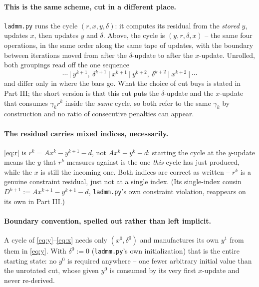 \documentclass[11pt]{article}
\newcommand{\code}[1]{\texttt{#1}}
\begin{document}
\paragraph{This is the same scheme, cut in a different place.}
\code{ladmm.py} runs the cycle $(r,x,y,\delta)$: it computes its residual from the
\emph{stored} $y$, updates $x$, then updates $y$ and $\delta$. Above, the cycle is
$(y,r,\delta,x)$ -- the same four operations, in the same order along the same
tape of updates, with the boundary between iterations moved from after the
$\delta$-update to after the $x$-update. Unrolled, both groupings read off the one
sequence
\[
\cdots\ \big|\ y^{k+1},\ \delta^{k+1}\ \big|\ x^{k+1}\ \big|\ y^{k+2},\ \delta^{k+2}\ \big|\ x^{k+2}\ \big|\ \cdots
\]
and differ only in where the bars go. What the choice of cut buys is stated in
Part III; the short version is that this cut puts the $\delta$-update and the
$x$-update that consumes $\gamma_kr^k$ inside the \emph{same} cycle, so both refer
to the same $\gamma_k$ by construction and no ratio of consecutive penalties can
appear.

\paragraph{The residual carries mixed indices, necessarily.}
\eqref{eq:r} is $r^k=Ax^k-y^{k+1}-d$, not $Ax^k-y^k-d$: starting the cycle at the
$y$-update means the $y$ that $r^k$ measures against is the one \emph{this} cycle
has just produced, while the $x$ is still the incoming one. Both indices are
correct as written -- $r^k$ is a genuine constraint residual, just not at a single
index. (Its single-index cousin $D^{k+1}:=Ax^{k+1}-y^{k+1}-d$, \code{ladmm.py}'s
own constraint violation, reappears on its own in Part III.)

\paragraph{Boundary convention, spelled out rather than left implicit.}
A cycle of \eqref{eq:y}--\eqref{eq:x} needs only $(x^0,\delta^0)$ and
manufactures its own $y^1$ from them in \eqref{eq:y}. With $\delta^0:=0$
(\code{ladmm.py}'s own initialization) that is the entire starting state: no $y^0$
is required anywhere -- one fewer arbitrary initial value than the unrotated cut,
whose given $y^0$ is consumed by its very first $x$-update and never re-derived.
\end{document}
